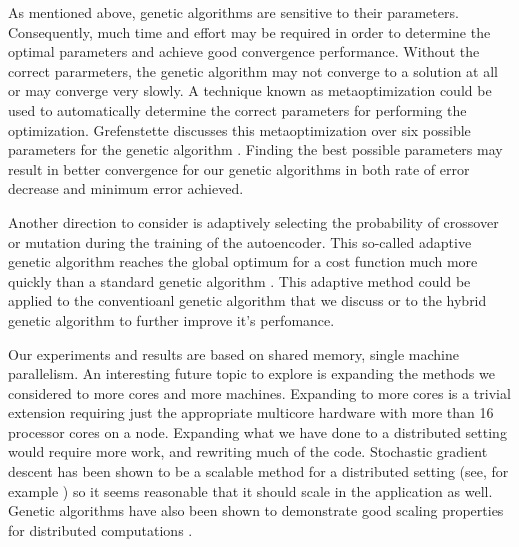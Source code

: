 As mentioned above, genetic algorithms are sensitive to their parameters. Consequently, much time and effort may be required in order to determine the optimal parameters and achieve good convergence performance. Without the correct pararmeters, the genetic algorithm may not converge to a solution at all or may converge very slowly. A technique known as metaoptimization could be used to automatically determine the correct parameters for performing the optimization. Grefenstette discusses this metaoptimization over six possible parameters for the genetic algorithm \cite{metaoptimization}. Finding the best possible parameters may result in better convergence for our genetic algorithms in both rate of error decrease and minimum error achieved.

Another direction to consider is adaptively selecting the probability of crossover or mutation during the training of the autoencoder. This so-called adaptive genetic algorithm reaches the global optimum for a cost function much more quickly than a standard genetic algorithm \cite{srinivas94adaptive}. This adaptive method could be applied to the conventioanl genetic algorithm that we discuss or to the hybrid genetic algorithm to further improve it's perfomance.

Our experiments and results are based on shared memory, single machine parallelism. An interesting future topic to explore is expanding the methods we considered to more cores and more machines. Expanding to more cores is a trivial extension requiring just the appropriate multicore hardware with more than 16 processor cores on a node. Expanding what we have done to a distributed setting would require more work, and rewriting much of the code. Stochastic gradient descent has been shown to be a scalable method for a distributed setting (see, for example \cite{zinkevich2010psgd}) so it seems reasonable that it should scale in the application as well. Genetic algorithms have also been shown to demonstrate good scaling properties for distributed computations \cite{Belding95thedistributed}.
